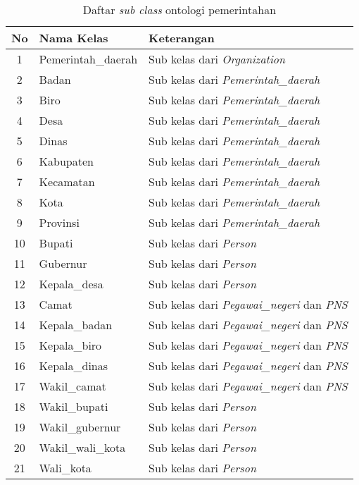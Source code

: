 \begin{table}[hb]
	\caption{Daftar \emph{sub class} ontologi pemerintahan}
	\label{table:sub_class_ontogov}
	\begin{tabularx}{\textwidth}{|c|l|X|}
		\hline
			\textbf{No} & \textbf{Nama Kelas} & \textbf{Keterangan} \\
		\hline
			1 & Pemerintah\_daerah & Sub kelas dari \emph{Organization} \\
		\hline
			2 & Badan & Sub kelas dari \emph{Pemerintah\_daerah} \\
		\hline
			3 & Biro & Sub kelas dari \emph{Pemerintah\_daerah} \\
		\hline
			4 & Desa & Sub kelas dari \emph{Pemerintah\_daerah} \\
		\hline
			5 & Dinas & Sub kelas dari \emph{Pemerintah\_daerah} \\
		\hline
			6 & Kabupaten & Sub kelas dari \emph{Pemerintah\_daerah} \\
		\hline
			7 & Kecamatan & Sub kelas dari \emph{Pemerintah\_daerah} \\
		\hline
			8 & Kota & Sub kelas dari \emph{Pemerintah\_daerah} \\
		\hline
			9 & Provinsi & Sub kelas dari \emph{Pemerintah\_daerah} \\
		\hline
		   10 & Bupati & Sub kelas dari \emph{Person} \\
		\hline
		   11 & Gubernur & Sub kelas dari \emph{Person} \\
		\hline
		   12 & Kepala\_desa & Sub kelas dari \emph{Person} \\
		\hline
		   13 & Camat & Sub kelas dari \emph{Pegawai\_negeri} dan \emph{PNS} \\
		\hline
		   14 & Kepala\_badan & Sub kelas dari \emph{Pegawai\_negeri} dan \emph{PNS} \\
		\hline
		   15 & Kepala\_biro & Sub kelas dari \emph{Pegawai\_negeri} dan \emph{PNS} \\
		\hline
		   16 & Kepala\_dinas & Sub kelas dari \emph{Pegawai\_negeri} dan \emph{PNS} \\
		\hline
		   17 & Wakil\_camat & Sub kelas dari \emph{Pegawai\_negeri} dan \emph{PNS} \\
		\hline
		   18 & Wakil\_bupati & Sub kelas dari \emph{Person} \\
		\hline
		   19 & Wakil\_gubernur & Sub kelas dari \emph{Person} \\
		\hline
		   20 & Wakil\_wali\_kota & Sub kelas dari \emph{Person} \\
		\hline
		   21 & Wali\_kota & Sub kelas dari \emph{Person} \\
		\hline
	\end{tabularx}
\end{table}

